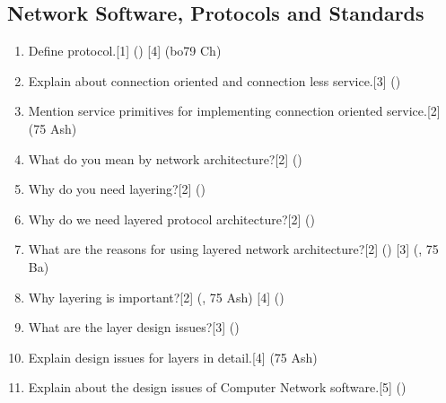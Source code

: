 \documentclass[12pt]{article}
\begin{document}
	\subsection{Network Software, Protocols and Standards}
		\begin{enumerate}[noitemsep, topsep = 0pt]
			\item Define protocol.\hfill[1] () [4] (bo{79 Ch}) 

			\item Explain about connection oriented and connection less service.\hfill[3] ()
			\item Mention service primitives for implementing connection oriented service.\hfill[2] (75 Ash)
			\item What do you mean by network architecture?\hfill[2] ()
			\item Why do you need layering?\hfill[2] ()
			\item Why do we need layered protocol architecture?\hfill[2] ()
			\item What are the reasons for using layered network architecture?\hfill[2] () [3] (, 75 Ba)
			\item Why layering is important?\hfill[2] (, 75 Ash) [4] ()
			\item What are the layer design issues?\hfill[3] ()
			\item Explain design issues for layers in detail.\hfill[4] (75 Ash)
			\item Explain about the design issues of Computer Network software.\hfill[5] ()
		\end{enumerate}
\end{document}
